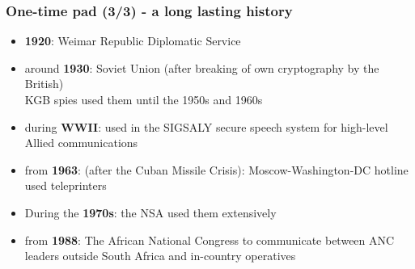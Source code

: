 \documentclass[
hyperref={pdfpagelabels=false}
,xcolor=table
]
{beamer}
\begin{document}
\begin{frame}
  \frametitle{One-time pad (3/3) - a long lasting history}
  \begin{itemize}
  \item \textbf{1920}: Weimar Republic Diplomatic Service
  \item around \textbf{1930}: Soviet Union (after breaking of own cryptography by the British)\\
    KGB spies used them until the 1950s and 1960s
  \item during \textbf{WWII}: used in the SIGSALY secure speech system
    for high-level Allied communications
  \item from \textbf{1963}: (after the Cuban Missile Crisis):
    Moscow-Washington-DC hotline used teleprinters
  \item During the \textbf{1970s}: the NSA used them extensively
  \item from \textbf{1988}: The African National Congress to
    communicate between ANC leaders outside South Africa and
    in-country operatives
  \end{itemize}
\end{frame}

  
\end{document}
